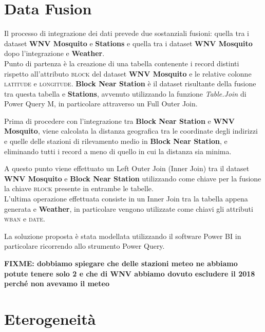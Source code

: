 
\section{Data Fusion}
Il processo di integrazione dei dati prevede due sostanziali fusioni: quella tra i dataset \textbf{WNV Mosquito} e \textbf{Stations} e quella tra i dataset \textbf{WNV Mosquito} dopo l'integrazione e \textbf{Weather}.\\ 

Punto di partenza è la creazione di una tabella contenente i record distinti rispetto all'attributo \textsc{block} del dataset \textbf{WNV Mosquito} e le relative colonne \textsc{latitude} e \textsc{longitude}. 
\textbf{Block Near Station} è il dataset risultante della fusione tra questa tabella e \textbf{Stations}, avvenuto utilizzando la funzione \textit{Table.Join} di Power Query M, in particolare attraverso un Full Outer Join. 

Prima di procedere con l'integrazione tra \textbf{Block Near Station} e \textbf{WNV Mosquito}, viene calcolata la distanza geografica tra le coordinate degli indirizzi e quelle delle stazioni di rilevamento medio in \textbf{Block Near Station}, e eliminando tutti i record a meno di quello in cui la distanza sia minima.

A questo punto viene effettuato un Left Outer Join (Inner Join) tra il dataset \textbf{WNV Mosquito} e \textbf{Block Near Station} utilizzando come chiave per la fusione la chiave \textsc{block} presente in entrambe le tabelle.\\


L'ultima operazione effettuata consiste in un Inner Join tra la tabella appena generata e \textbf{Weather}, in particolare vengono utilizzate come chiavi gli attributi \textsc{wban} e \textsc{date}.

La soluzione proposta è stata modellata utilizzando il software Power BI in particolare ricorrendo allo strumento Power Query.

\textbf{FIXME: dobbiamo spiegare che delle stazioni meteo ne abbiamo potute 
tenere solo 2 e che di WNV abbiamo dovuto escludere il 2018 perché non avevamo 
il meteo}

\section{Eterogeneità}